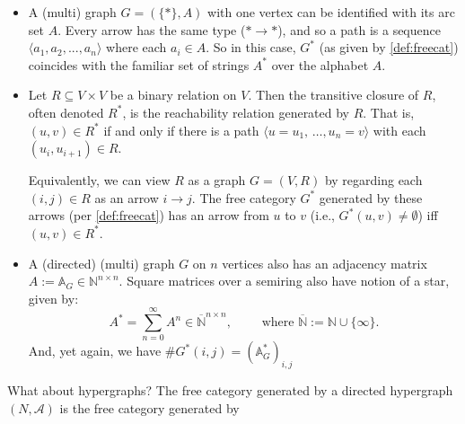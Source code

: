 \begin{itemize}
    \item 
A (multi) graph $G = (\{\ast\}, A)$ with one vertex can be identified with its arc set $A$. Every arrow has the same type ($\ast \to \ast$), and so a path is a sequence 
$\langle a_1, a_2, ..., a_n\rangle$
where each $a_i \in A$. 
So in this case, $G^*$ (as given by \cref{def:freecat}) coincides
with the familiar set of strings $A^*$ over the alphabet $A$.

    \item
Let $R \subseteq V \times V$ be a binary relation on $V$.
Then the transitive closure of $R$, often denoted $R^*$,
    is the reachability relation generated by $R$. 
That is, $(u,v) \in R^*$ if and only if there is a path $\langle u{=}u_1,\, \ldots, u_n{=}v\rangle$ with each $(u_i, u_{i+1}) \in R$.

Equivalently, we can view $R$ as a graph $G = (V,R)$ by regarding each $(i,j) \in R$ as an arrow $i \to j$. The free category $G^*$ generated by these arrows (per \cref{def:freecat}) has an arrow from $u$ to $v$ (i.e., $G^*(u,v) \ne \emptyset$) iff $(u,v) \in R^*$.

\item 
A (directed) (multi) graph $G$ on $n$ vertices also has an adjacency matrix 
$A := \mathbb A_G \in \mathbb N^{n\times n}$.  Square matrices over a semiring
also have notion of a star, given by:
\[
    A^* = \sum_{n=0}^\infty A^n  \in \overline{\mathbb N}^{n\times n},
    \qquad \text{ where } \overline{\mathbb N} := \mathbb N \cup \{\infty\}.
\]
And, yet again, we have $\#G^*(i,j) = (\mathbb A_G^*)_{i,j}$
\end{itemize}


What about hypergraphs?
The free category generated by a directed hypergraph
$(N, \mathcal A)$
is the free category generated by 


\begin{defn}
    
\end{defn}



